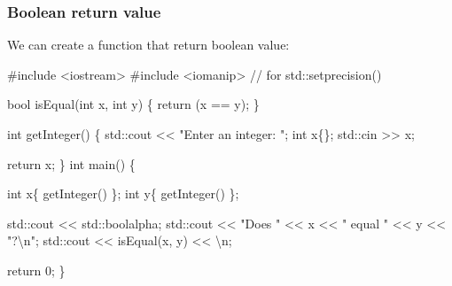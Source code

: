 \documentclass[
  letterpaper,
  DIV=11,
  numbers=noendperiod]{scrreprt}
\newenvironment{Shaded}{\begin{snugshade}}{\end{snugshade}}
\newcommand{\CommentTok}[1]{\textcolor[rgb]{0.37,0.37,0.37}{#1}}
\newcommand{\DecValTok}[1]{\textcolor[rgb]{0.68,0.00,0.00}{#1}}
\newcommand{\ErrorTok}[1]{\textcolor[rgb]{0.68,0.00,0.00}{#1}}
\newcommand{\FunctionTok}[1]{\textcolor[rgb]{0.28,0.35,0.67}{#1}}
\newcommand{\NormalTok}[1]{\textcolor[rgb]{0.00,0.23,0.31}{#1}}
\newcommand{\SpecialCharTok}[1]{\textcolor[rgb]{0.37,0.37,0.37}{#1}}
\newcommand{\StringTok}[1]{\textcolor[rgb]{0.13,0.47,0.30}{#1}}
\begin{document}
\hypertarget{boolean-return-value}{%
\subsubsection{Boolean return value}\label{boolean-return-value}}

We can create a function that return boolean value:

\begin{Shaded}
\begin{Highlighting}[]
\CommentTok{\#include \textless{}iostream\textgreater{}}
\CommentTok{\#include \textless{}iomanip\textgreater{}      // for std::setprecision()}

\NormalTok{bool }\FunctionTok{isEqual}\NormalTok{(int x, int y) \{}
    \FunctionTok{return}\NormalTok{ (x }\SpecialCharTok{==}\NormalTok{ y);}
\NormalTok{\}}

\NormalTok{int }\FunctionTok{getInteger}\NormalTok{() \{}
\NormalTok{    std}\SpecialCharTok{::}\NormalTok{cout }\SpecialCharTok{\textless{}}\ErrorTok{\textless{}} \StringTok{"Enter an integer: "}\NormalTok{;}
\NormalTok{    int x\{\};}
\NormalTok{    std}\SpecialCharTok{::}\NormalTok{cin }\SpecialCharTok{\textgreater{}}\ErrorTok{\textgreater{}}\NormalTok{ x;}

\NormalTok{    return x;}
\NormalTok{\}}
\NormalTok{int }\FunctionTok{main}\NormalTok{() \{}
    
\NormalTok{    int x\{ }\FunctionTok{getInteger}\NormalTok{() \};}
\NormalTok{    int y\{ }\FunctionTok{getInteger}\NormalTok{() \};}

\NormalTok{    std}\SpecialCharTok{::}\NormalTok{cout }\SpecialCharTok{\textless{}}\ErrorTok{\textless{}}\NormalTok{ std}\SpecialCharTok{::}\NormalTok{boolalpha;}
\NormalTok{    std}\SpecialCharTok{::}\NormalTok{cout }\SpecialCharTok{\textless{}}\ErrorTok{\textless{}} \StringTok{"Does "} \SpecialCharTok{\textless{}}\ErrorTok{\textless{}}\NormalTok{ x }\SpecialCharTok{\textless{}}\ErrorTok{\textless{}} \StringTok{" equal "} \SpecialCharTok{\textless{}}\ErrorTok{\textless{}}\NormalTok{ y }\SpecialCharTok{\textless{}}\ErrorTok{\textless{}} \StringTok{"?}\SpecialCharTok{\textbackslash{}n}\StringTok{"}\NormalTok{;}
\NormalTok{    std}\SpecialCharTok{::}\NormalTok{cout }\SpecialCharTok{\textless{}}\ErrorTok{\textless{}} \FunctionTok{isEqual}\NormalTok{(x, y) }\SpecialCharTok{\textless{}}\ErrorTok{\textless{}} \StringTok{\textquotesingle{}}\SpecialCharTok{\textbackslash{}n}\StringTok{\textquotesingle{}}\NormalTok{;}

\NormalTok{    return }\DecValTok{0}\NormalTok{;}
\NormalTok{\}}
\end{Highlighting}
\end{Shaded}
\end{document}
